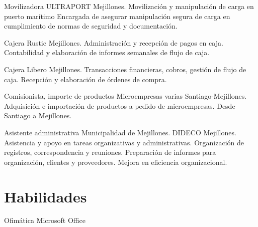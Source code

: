\documentclass[draft,color,12pt,letterpaper,sans]{moderncv}
\begin{document}
{Movilizadora}
{\newline ULTRAPORT}
{\newline Mejillones.}
{}
{Movilización y manipulación de carga en puerto marítimo 
\newline Encargada de asegurar manipulación segura de carga en cumplimiento de normas de seguridad y documentación.
\newline}

{Cajera}
{\newline Rustic}
{\newline Mejillones.}
{}
{Administración y recepción de pagos en caja. 
\newline Contabilidad y elaboración de informes semanales de flujo de caja.
\newline}

{Cajera}
{\newline Libero}
{\newline Mejillones.}
{}
{Transacciones financieras, cobros, gestión de flujo de caja.
\newline Recepción y elaboración de órdenes de compra.
\newline}

{Comisionista, importe de productos}
{\newline Microempresas varias}
{\newline Santiago-Mejillones.}
{}
{Adquisición e importación de productos a pedido de microempresas. Desde Santiago a Mejillones.
\newline}

{Asistente administrativa}
{\newline Municipalidad de Mejillones. DIDECO}
{\newline Mejillones.}
{}
{Asistencia y apoyo en tareas organizativas y administrativas.
\newline Organización de registros, correspondencia y reuniones.
\newline Preparación de informes para organización, clientes y proveedores.
\newline Mejora en eficiencia organizacional.
\newline}


\newpage

\section{Habilidades}

\cventry {}
{Ofimática}
{}
{}
{\newline Microsoft Office}
{}
\end{document}
